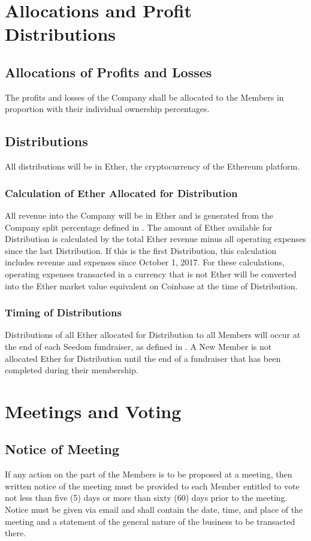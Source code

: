 \documentclass[11pt]{article}
\begin{document}
\section{Allocations and Profit Distributions}

\subsection{Allocations of Profits and Losses}
The profits and losses of the Company shall be allocated to the Members in proportion with their individual ownership percentages.

\subsection{Distributions}
All distributions will be in Ether, the cryptocurrency of the Ethereum platform.

\subsubsection{Calculation of Ether Allocated for Distribution}
All revenue into the Company will be in Ether and is generated from the Company split percentage defined in . The amount of Ether available for Distribution is calculated by the total Ether revenue minus all operating expenses since the last Distribution. If this is the first Distribution, this calculation includes revenue and expenses since October 1, 2017. For these calculations, operating expenses transacted in a currency that is not Ether will be converted into the Ether market value equivalent on Coinbase at the time of Distribution.

\subsubsection{Timing of Distributions}
Distributions of all Ether allocated for Distribution to all Members will occur at the end of each Seedom fundraiser, as defined in . A New Member is not allocated Ether for Distribution until the end of a fundraiser that has been completed during their membership.

\section{Meetings and Voting}

\subsection{Notice of Meeting}
If any action on the part of the Members is to be proposed at a meeting, then written notice of the meeting must be provided to each Member entitled to vote not less than five (5) days or more than sixty (60) days prior to the meeting. Notice must be given via email and shall contain the date, time, and place of the meeting and a statement of the general nature of the business to be transacted there.
\end{document}
